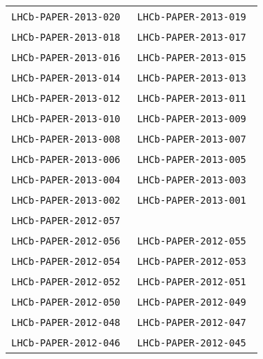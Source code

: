 \begin{center}
\begin{longtable}{ll}
\texttt{LHCb-PAPER-2013-020}~\cite{LHCb-PAPER-2013-020} &
\texttt{LHCb-PAPER-2013-019}~\cite{LHCb-PAPER-2013-019} \\
\texttt{LHCb-PAPER-2013-018}~\cite{LHCb-PAPER-2013-018} &
\texttt{LHCb-PAPER-2013-017}~\cite{LHCb-PAPER-2013-017} \\
\texttt{LHCb-PAPER-2013-016}~\cite{LHCb-PAPER-2013-016} &
\texttt{LHCb-PAPER-2013-015}~\cite{LHCb-PAPER-2013-015} \\
\texttt{LHCb-PAPER-2013-014}~\cite{LHCb-PAPER-2013-014} &
\texttt{LHCb-PAPER-2013-013}~\cite{LHCb-PAPER-2013-013} \\
\texttt{LHCb-PAPER-2013-012}~\cite{LHCb-PAPER-2013-012} &
\texttt{LHCb-PAPER-2013-011}~\cite{LHCb-PAPER-2013-011} \\
\texttt{LHCb-PAPER-2013-010}~\cite{LHCb-PAPER-2013-010} &
\texttt{LHCb-PAPER-2013-009}~\cite{LHCb-PAPER-2013-009} \\
\texttt{LHCb-PAPER-2013-008}~\cite{LHCb-PAPER-2013-008} &
\texttt{LHCb-PAPER-2013-007}~\cite{LHCb-PAPER-2013-007} \\
\texttt{LHCb-PAPER-2013-006}~\cite{LHCb-PAPER-2013-006} &
\texttt{LHCb-PAPER-2013-005}~\cite{LHCb-PAPER-2013-005} \\
\texttt{LHCb-PAPER-2013-004}~\cite{LHCb-PAPER-2013-004} &
\texttt{LHCb-PAPER-2013-003}~\cite{LHCb-PAPER-2013-003} \\
\texttt{LHCb-PAPER-2013-002}~\cite{LHCb-PAPER-2013-002} &
\texttt{LHCb-PAPER-2013-001}~\cite{LHCb-PAPER-2013-001} \\
\hline
\texttt{LHCb-PAPER-2012-057}~\cite{LHCb-PAPER-2012-057} \\
\texttt{LHCb-PAPER-2012-056}~\cite{LHCb-PAPER-2012-056} & 
\texttt{LHCb-PAPER-2012-055}~\cite{LHCb-PAPER-2012-055} \\
\texttt{LHCb-PAPER-2012-054}~\cite{LHCb-PAPER-2012-054} & 
\texttt{LHCb-PAPER-2012-053}~\cite{LHCb-PAPER-2012-053} \\
\texttt{LHCb-PAPER-2012-052}~\cite{LHCb-PAPER-2012-052} & 
\texttt{LHCb-PAPER-2012-051}~\cite{LHCb-PAPER-2012-051} \\
\texttt{LHCb-PAPER-2012-050}~\cite{LHCb-PAPER-2012-050} & 
\texttt{LHCb-PAPER-2012-049}~\cite{LHCb-PAPER-2012-049} \\
\texttt{LHCb-PAPER-2012-048}~\cite{LHCb-PAPER-2012-048} & 
\texttt{LHCb-PAPER-2012-047}~\cite{LHCb-PAPER-2012-047} \\
\texttt{LHCb-PAPER-2012-046}~\cite{LHCb-PAPER-2012-046} & 
\texttt{LHCb-PAPER-2012-045}~\cite{LHCb-PAPER-2012-045} \\

\end{longtable}
\end{center}
